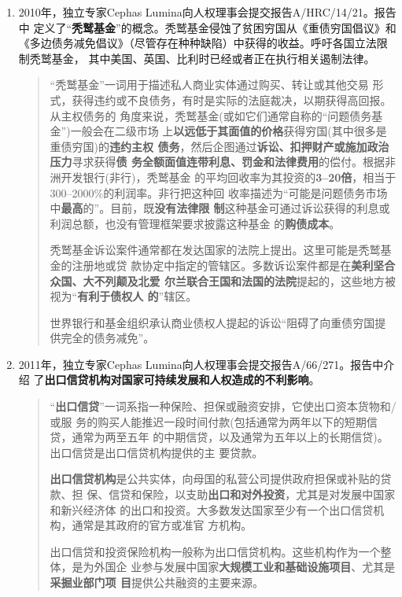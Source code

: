 \begin{enumerate}
\item 2010年，独立专家Cephas Lumina向人权理事会提交报告A/HRC/14/21。报告中
  定义了“\textbf{秃鹫基金}”的概念。秃鹫基金侵蚀了贫困穷国从《重债穷国倡议》和
  《多边债务减免倡议》（尽管存在种种缺陷）中获得的收益。呼吁各国立法限制秃鹫基金，
  其中美国、英国、比利时已经或者正在执行相关遏制法律。
  \begin{quotation}
    “秃鹫基金”一词用于描述私人商业实体通过购买、转让或其他交易
    形式，获得违约或不良债务，有时是实际的法庭裁决，以期获得高回报。从主权债务的
    角度来说，秃鹫基金(或如它们通常自称的“问题债务基金”)一般会在二级市场
    上\textbf{以远低于其面值的价格}获得穷国(其中很多是重债穷国)的\textbf{违约主权
      债务}，然后企图通过\textbf{诉讼、扣押财产或施加政治压力}寻求获得\textbf{债
      务全额面值连带利息、罚金和法律费用}的偿付。根据非洲开发银行(非行)，秃鹫基金
    的平均回收率为其投资的\textbf{3--20倍}，相当于300--2000\%的利润率。非行把这种回
    收率描述为“可能是问题债务市场中\textbf{最高}的”。目前，既\textbf{没有法律限
      制}这种基金可通过诉讼获得的利息或利润总额，也没有管理框架要求披露这种基金
    的\textbf{购债成本}。

    秃鹫基金诉讼案件通常都在发达国家的法院上提出。这里可能是秃鹫基金的注册地或贷
    款协定中指定的管辖区。多数诉讼案件都是在\textbf{美利坚合众国、大不列颠及北爱
      尔兰联合王国和法国的法院}提起的，这些地方被视为“\textbf{有利于债权人
      的}”辖区。

    世界银行和基金组织承认商业债权人提起的诉讼“阻碍了向重债穷国提供完全的债务减免”。
  \end{quotation}

\item 2011年，独立专家Cephas Lumina向人权理事会提交报告A/66/271。报告中介绍
  了\textbf{出口信贷机构对国家可持续发展和人权造成的不利影响}。

  \begin{quotation}
    “\textbf{出口信贷}”一词系指一种保险、担保或融资安排，它使出口资本货物和/或服
    务的购买人能推迟一段时间付款(包括通常为两年以下的短期信贷，通常为两至五年
    的中期信贷，以及通常为五年以上的长期信贷)。出口信贷是出口信贷机构提供的主
    要贷款。

    \textbf{出口信贷机构}是公共实体，向母国的私营公司提供政府担保或补贴的贷款、担
    保、信贷和保险，以支助\textbf{出口和对外投资}，尤其是对发展中国家和新兴经济体
    的出口和投资。大多数发达国家至少有一个出口信贷机构，通常是其政府的官方或准官
    方机构。

    出口信贷和投资保险机构一般称为出口信贷机构。这些机构作为一个整体，是为外国企
    业参与发展中国家\textbf{大规模工业和基础设施项目}、尤其是\textbf{采掘业部门项
      目}提供公共融资的主要来源。


\end{quotation}
\end{enumerate}
